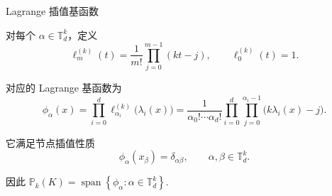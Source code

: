 \documentclass[aspectratio=169,professionalfonts]{ctexbeamer}
\begin{document}
\begin{frame}{Lagrange 插值基函数}

对每个 $\alpha\in\mathbb T_d^k$，定义
$$
\ell_m^{(k)}(t)
=
\frac{1}{m!}
\prod_{j=0}^{m-1}(kt-j),
\qquad
\ell_0^{(k)}(t)=1.
$$

对应的 Lagrange 基函数为
$$
\phi_\alpha(x)
=
\prod_{i=0}^{d}
\ell_{\alpha_i}^{(k)}\bigl(\lambda_i(x)\bigr)
=
\frac{1}{\alpha_0!\cdots\alpha_d!}
\prod_{i=0}^{d}
\prod_{j=0}^{\alpha_i-1}
\bigl(k\lambda_i(x)-j\bigr).
$$

它满足节点插值性质
$$
\phi_\alpha(x_\beta)
=
\delta_{\alpha\beta},
\qquad
\alpha,\beta\in\mathbb T_d^k.
$$
\vspace{0.01em}

因此
$
\mathbb P_k(K)
=
\operatorname{span}
\left\{
\phi_\alpha:\alpha\in\mathbb T_d^k
\right\}.
$

\end{frame}
\end{document}
